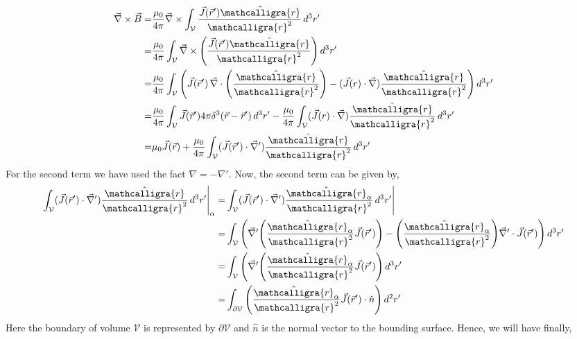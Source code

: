 \documentclass{article}
\newcommand{\scriptr}{\mathord{\mathcalligra{r}}}
\begin{document}
\begin{equation*}
    \begin{split}
        \vec{\nabla}\times \vec{B} = & \frac{\mu_0}{4\pi}\vec{\nabla}\times \int_{\mathcal{V}} \frac{\vec{J}(\vec{r}')\hat{\scriptr}}{\scriptr^2}\, d^3r'\\
        = &  \frac{\mu_0}{4\pi} \int_{\mathcal{V}} \vec{\nabla}\times \Bigg(\frac{\vec{J}(\vec{r}')\hat{\scriptr}}{\scriptr^2}\Bigg)\, d^3r'\\
        = &  \frac{\mu_0}{4\pi} \int_{\mathcal{V}} \Bigg( \vec{J}(\vec{r}') \, \vec{\nabla}\cdot \Bigg(\frac{\hat{\scriptr}}{\scriptr^2}\Bigg) - (\vec{J}(r)\cdot \vec{\nabla})\frac{\hat{\scriptr}}{\scriptr^2}\Bigg)\, d^3r'\\
        = & \frac{\mu_0}{4\pi} \int_{\mathcal{V}} \vec{J}(\vec{r}')4\pi \delta^3(\vec{r}-\vec{r}')\, d^3r' -  \frac{\mu_0}{4\pi} \int_{\mathcal{V}} (\vec{J}(r)\cdot \vec{\nabla})\frac{\hat{\scriptr}}{\scriptr^2}\, d^3r'\\
        = & \mu_0 \vec{J}(\vec{r}) + \frac{\mu_0}{4\pi}\int_{\mathcal{V}}(\vec{J}(\vec{r}')\cdot \vec{\nabla}')\frac{\hat{\scriptr}}{\scriptr^2}\, d^3 r'
    \end{split}
\end{equation*}
For the second term we have used the fact $\nabla = - \nabla'$. Now, the second term can be given by,
\begin{equation*}
    \begin{split}
    \int_{\mathcal{V}}(\vec{J}(\vec{r}')\cdot \vec{\nabla}')\frac{\hat{\scriptr}}{\scriptr^2}\, d^3 r'\Bigg|_\alpha = &  \int_{\mathcal{V}}(\vec{J}(\vec{r}')\cdot \vec{\nabla}')\frac{\hat{\scriptr}_\alpha}{\scriptr^2}\, d^3 r'\Bigg| \\
    = &  \int_{\mathcal{V}} \Bigg( \vec{\nabla}' \Bigg( \frac{\hat{\scriptr}_\alpha}{\scriptr^2} \vec{J}(\vec{r}')\Bigg) - \Bigg( \frac{\hat{\scriptr}_\alpha}{\scriptr^2}\Bigg) \vec{\nabla}'\cdot\vec{J}(\vec{r}') \Bigg)\, d^3r'\\
    = & \int_{\mathcal{V}} \Bigg( \vec{\nabla}' \Bigg( \frac{\hat{\scriptr}_\alpha}{\scriptr^2} \vec{J}(\vec{r}')\Bigg)\, d^3r'\\
    = & \int_{\partial \mathcal{V}}\Bigg( \frac{\hat{\scriptr}_\alpha}{\scriptr^2}\vec{J}(\vec{r}')\cdot \hat{n} \Bigg)\, d^2r'
    \end{split}
\end{equation*}
Here the boundary of volume $\mathcal{V}$ is represented by $\partial\mathcal{V}$ and $\hat{n}$ is the normal vector to the bounding surface. Hence, we will have finally,
\end{document}
